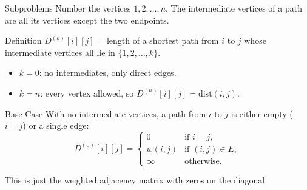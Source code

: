 \documentclass[10pt,aspectratio=169,xcolor=table]{beamer}
\begin{document}
\begin{frame}{Subproblems}
  Number the vertices $1, 2, \ldots, n$. The \alert{intermediate} vertices of
  a path are all its vertices except the two endpoints.

  \begin{block}{Definition}
    $D^{(k)}[i][j]$ = length of a shortest path from $i$ to $j$ whose
    intermediate vertices all lie in $\{1, 2, \ldots, k\}$.
  \end{block}

  \begin{center}
  \end{center}

  \begin{itemize}
    \item $k = 0$: no intermediates, only direct edges.
    \item $k = n$: every vertex allowed, so $D^{(n)}[i][j] = \text{dist}(i, j)$.
  \end{itemize}
\end{frame}

\begin{frame}{Base Case}
  With no intermediate vertices, a path from $i$ to $j$ is either empty
  ($i = j$) or a single edge:
  \[
    D^{(0)}[i][j] =
    \begin{cases}
      0 & \text{if } i = j, \\
      w(i, j) & \text{if } (i, j) \in E, \\
      \infty & \text{otherwise.}
    \end{cases}
  \]

  \bigskip
  This is just the weighted adjacency matrix with zeros on the diagonal.
\end{frame}
\end{document}
